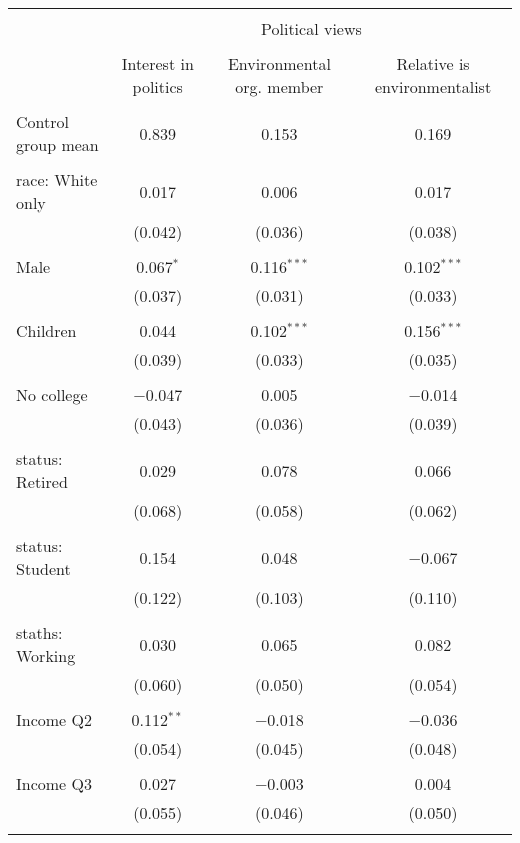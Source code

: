 
\begin{tabular}{@{\extracolsep{5pt}}lccc} 
\\[-1.8ex]\hline 
\hline \\[-1.8ex] 
 & \multicolumn{3}{c}{Political views} \\ 
\cline{2-4} 
\\[-1.8ex] & Interest in politics & Environmental org. member & Relative is environmentalist \\ 
\hline \\[-1.8ex] 
 Control group mean & 0.839 & 0.153 & 0.169  \\ \hline \\[-1.8ex] race: White only & 0.017 & 0.006 & 0.017 \\ 
  & (0.042) & (0.036) & (0.038) \\ 
  & & & \\ 
 Male & 0.067$^{*}$ & 0.116$^{***}$ & 0.102$^{***}$ \\ 
  & (0.037) & (0.031) & (0.033) \\ 
  & & & \\ 
 Children & 0.044 & 0.102$^{***}$ & 0.156$^{***}$ \\ 
  & (0.039) & (0.033) & (0.035) \\ 
  & & & \\ 
 No college & $-$0.047 & 0.005 & $-$0.014 \\ 
  & (0.043) & (0.036) & (0.039) \\ 
  & & & \\ 
 status: Retired & 0.029 & 0.078 & 0.066 \\ 
  & (0.068) & (0.058) & (0.062) \\ 
  & & & \\ 
 status: Student & 0.154 & 0.048 & $-$0.067 \\ 
  & (0.122) & (0.103) & (0.110) \\ 
  & & & \\ 
 staths: Working & 0.030 & 0.065 & 0.082 \\ 
  & (0.060) & (0.050) & (0.054) \\ 
  & & & \\ 
 Income Q2 & 0.112$^{**}$ & $-$0.018 & $-$0.036 \\ 
  & (0.054) & (0.045) & (0.048) \\ 
  & & & \\ 
 Income Q3 & 0.027 & $-$0.003 & 0.004 \\ 
  & (0.055) & (0.046) & (0.050) \\ 
  & & & \\ 

\end{tabular}
